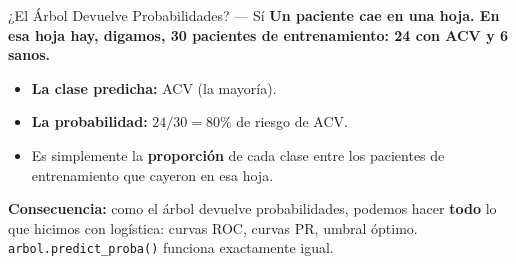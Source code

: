 \documentclass[aspectratio=169, 11pt]{beamer}
\begin{document}

\begin{frame}{¿El Árbol Devuelve Probabilidades? --- Sí}
  \vspace{-4pt}
  {\footnotesize\color{arcaDark}\bfseries
    Un paciente cae en una hoja. En esa hoja hay, digamos,
    30 pacientes de entrenamiento: 24 con ACV y 6 sanos.}

  \vspace{8pt}
  {\footnotesize
  \begin{itemize}\setlength{\itemsep}{5pt}
    \item[{\color{arcaRed}\scriptsize\faArrowRight}]
      \textbf{La clase predicha:} ACV (la mayoría).
    \item[{\color{arcaRed}\scriptsize\faArrowRight}]
      \textbf{La probabilidad:} $24/30 = 80\%$ de riesgo de ACV.
    \item[{\color{arcaRed}\scriptsize\faArrowRight}]
      Es simplemente la \textbf{proporción} de cada clase entre los
      pacientes de entrenamiento que cayeron en esa hoja.
  \end{itemize}
  }

  \vspace{6pt}
  \begin{tcolorbox}[colback=codeGreen!8, colframe=codeGreen, boxrule=0.5pt, arc=2pt,
    left=6pt, right=6pt, top=4pt, bottom=4pt]
    {\scriptsize\color{arcaDark}
    \faLightbulb\hspace{4pt}\textbf{Consecuencia:} como el árbol devuelve
    probabilidades, podemos hacer \textbf{todo} lo que hicimos con logística:
    curvas ROC, curvas PR, umbral óptimo.
    \texttt{arbol.predict\_proba()} funciona exactamente igual.}
  \end{tcolorbox}
\end{frame}
\end{document}
